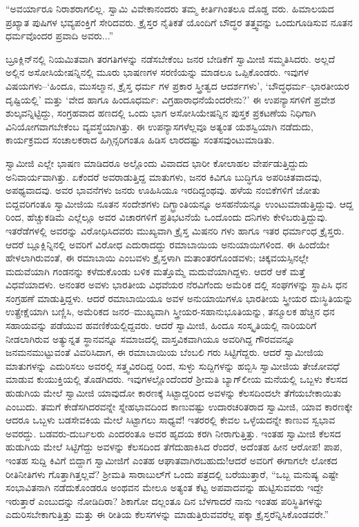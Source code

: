 “ಅವರ್ಯಾರೂ ನಿರಾಶರಾಗಲಿಲ್ಲ. ಸ್ವಾಮಿ ವಿವೇಕಾನಂದರು ತಮ್ಮ ಕೀರ್ತಿಗಿಂತಲೂ ದೊಡ್ಡ ವರು. ಹಿಮಾಲಯದ ಪ್ರಖ್ಯಾತ ಪುಷಿಗಳ ಭವ್ಯಪಂಕ್ತಿಗೆ ಸೇರಿದವರು. ಕ್ರೈಸ್ತರ ನೈತಿಕತೆ ಯೊಂದಿಗೆ ಬೌದ್ಧರ ತತ್ತ್ವವನ್ನು ಒಂದುಗೂಡಿಸುವ ನೂತನ ಧರ್ಮವೊಂದರ ಪ್ರವಾದಿ ಅವರು...”

ಬ್ರೂಕ್ಲಿನ್​ನಲ್ಲಿ ನಿಯಮಿತವಾಗಿ ತರಗತಿಗಳನ್ನು ನಡೆಸಬೇಕೆಂಬ ಜನರ ಬೇಡಿಕೆಗೆ ಸ್ವಾಮೀಜಿ ಸಮ್ಮತಿಸಿದರು. ಅಲ್ಲದೆ ಅಲ್ಲಿನ ಅಸೋಸಿಯೇಷನ್ನಿನಲ್ಲಿ ಮೂರು ಭಾಷಣಗಳ ಸರಣಿಯನ್ನು ಮಾಡಲೂ ಒಪ್ಪಿಕೊಂಡರು. ಇವುಗಳ ವಿಷಯಗಳು–‘ಹಿಂದೂ, ಮುಸಲ್ಮಾನ, ಕ್ರೈಸ್ತ ಧರ್ಮ ಗಳ ಪ್ರಕಾರ ಸ್ತ್ರೀತ್ವದ ಆದರ್ಶಗಳು’, ‘ಬೌದ್ಧಧರ್ಮ–ಭಾರತೀಯರ ದೃಷ್ಟಿಯಲ್ಲಿ’ ಮತ್ತು ‘ವೇದ ಹಾಗೂ ಹಿಂದೂಧರ್ಮ: ವಿಗ್ರಹಾರಾಧನೆಯೆಂದರೇನು?’ ಈ ಉಪನ್ಯಾಸಗಳಿಗೆ ಪ್ರವೇಶ ಶುಲ್ಕವನ್ನಿಟ್ಟಿದ್ದು, ಸಂಗ್ರಹವಾದ ಹಣದಲ್ಲಿ ಒಂದು ಭಾಗ ಅಸೋಸಿಯೇಷನ್ನಿನ ಪುಸ್ತಕ ಪ್ರಕಟಣೆಯ ನಿಧಿಗಾಗಿ ವಿನಿಯೋಗವಾಗಬೇಕೆಂಬ ವ್ಯವಸ್ಥೆಯಾಗಿತ್ತು. ಈ ಉಪನ್ಯಾಸಗಳೆಲ್ಲವೂ ಅತ್ಯಂತ ಯಶಸ್ವಿಯಾಗಿ ನಡೆದುದು, ಕಾರ್ಯಕ್ರಮದ ಸಂಚಾಲಕರಾದ ಹಿಗ್ಗಿನ್ಸರಿಗಂತೂ ಹಿಡಿಸ ಲಾರದಷ್ಟು ಸಂತಸವುಂಟುಮಾಡಿತು.

ಸ್ವಾಮೀಜಿ ಎಲ್ಲೇ ಭಾಷಣ ಮಾಡಿದರೂ ಅಲ್ಲೊಂದು ವಿವಾದದ ಭಾರೀ ಕೋಲಾಹಲ ವೇರ್ಪಡುತ್ತಿದ್ದುದು ಅನಿವಾರ್ಯವಾಗಿತ್ತು. ಏಕೆಂದರೆ ಅವರಾಡುತ್ತಿದ್ದ ಮಾತುಗಳು, ಜನರ ಕಿವಿಗೂ ಬುದ್ಧಿಗೂ ಅಪರಿಚಿತವಾದವು, ಅಪಥ್ಯವಾದವು. ಅವರ ಭಾವನೆಗಳು ಜನರು ಊಹಿಸಿಯೂ ಇರದಿದ್ದಂಥವು. ಹಳೆಯ ನಂಬಿಕೆಗಳಿಗೆ ಜೋತು ಬಿದ್ದವರಿಗಂತೂ ಸ್ವಾಮೀಜಿಯ ನೂತನ ಸಂದೇಶಗಳು ದಿಗ್ಭ್ರಾಂತಿಯನ್ನೂ ಅಸಹನೆಯನ್ನೂ ಉಂಟುಮಾಡುತ್ತಿದ್ದುವು. ಆದ್ದ ರಿಂದ, ಹೆಚ್ಚುಕಡಿಮೆ ಎಲ್ಲೆಲ್ಲೂ ಅವರ ವಿಚಾರಗಳಿಗೆ ಪ್ರತಿಭಟನೆಯೆ ಒಂದೊಂದು ದನಿಗಳು ಕೇಳಿಬರುತ್ತಿದ್ದುವು. ಇತರೆಡೆಗಳಲ್ಲಿ ಅವರನ್ನು ವಿರೋಧಿಸಿದವರು ಮುಖ್ಯವಾಗಿ ಕ್ರೈಸ್ತ ಮಿಷನರಿ ಗಳು ಹಾಗೂ ಇತರ ಧರ್ಮಾಂಧ ಕ್ರೈಸ್ತರು. ಆದರೆ ಬ್ಲೂಕ್ಲಿನ್ನಿನಲ್ಲಿ ಅವರಿಗೆ ವಿರೋಧ ಎದುರಾದದ್ದು ರಮಾಬಾಯಿಯ ಅನುಯಾಯಿಗಳಿಂದ. ಈ ಹಿಂದೆಯೇ ಹೇಳಲಾಗಿರುವಂತೆ, ಈ ರಮಾಬಾಯಿ ಎಂಬವಳು ಕ್ರೈಸ್ತಳಾಗಿ ಮತಾಂತರಗೊಂಡವಳು; ಚಿಕ್ಕವಯಸ್ಸಿನಲ್ಲೇ ಮದುವೆಯಾಗಿ ಗಂಡನನ್ನು ಕಳೆದುಕೊಂಡು ಬಳಿಕ ಮತ್ತೊಮ್ಮೆ ಮದುವೆಯಾಗಿದ್ದಳು. ಆದರೆ ಆಕೆ ಮತ್ತೆ ವಿಧವೆಯಾದಳು. ಅನಂತರ ಅವಳು ಭಾರತೀಯ ವಿಧವೆಯರ ನೆರವಿಗೆಂದು ಅಮೆರಿಕ ದಲ್ಲಿ ಸಂಘಗಳನ್ನು ಸ್ಥಾಪಿಸಿ ಧನ ಸಂಗ್ರಹಣೆ ಮಾಡುತ್ತಿದ್ದಳು. ಆದರೆ ರಮಾಬಾಯಿಯೂ ಅವಳ ಅನುಯಾಯಿಗಳೂ ಭಾರತೀಯ ಸ್ತ್ರೀಯರ ದುಃಸ್ಥಿತಿಯನ್ನು ಉತ್ಪ್ರೇಕ್ಷೆಯಾಗಿ ಬಣ್ಣಿಸಿ, ಅಮೆರಿಕದ ಜನರ–ಮುಖ್ಯವಾಗಿ ಸ್ತ್ರೀಯರ-ಸಹಾನುಭೂತಿಯನ್ನು, ತನ್ಮೂಲಕ ಹೆಚ್ಚಿನ ಧನ ಸಹಾಯವನ್ನು ಪಡೆಯುವ ಹವಣಿಕೆಯಲ್ಲಿದ್ದವರು. ಆದರೆ ಸ್ವಾಮೀಜಿ, ಹಿಂದೂ ಸಂಸ್ಕೃತಿಯಲ್ಲಿ ನಾರಿಯರಿಗೆ ನೀಡಲಾಗಿರುವ ಅತ್ಯುನ್ನತ ಸ್ಥಾನವನ್ನೂ ಸಮಾಜದಲ್ಲಿ ವಾಸ್ತವಿಕವಾಗಿಯೂ ಅವರಿಗಿದ್ದ ಗೌರವವನ್ನೂ ಜನಮನಮುಟ್ಟುವಂತೆ ವಿವರಿಸಿದಾಗ, ಈ ರಮಾಬಾಯಿಯ ಬೆಂಬಲಿ ಗರು ಸಿಟ್ಟಿಗೆದ್ದರು. ಆದರೆ ಸ್ವಾಮೀಜಿಯ ಮಾತುಗಳನ್ನು ಎದುರಿಸಲು ಅವರಲ್ಲಿ ಸತ್ತ್ವವಿರದಿದ್ದ ರಿಂದ, ಸುಳ್ಳು ಸುದ್ದಿಗಳನ್ನು ಹಬ್ಬಿಸಿ ಸ್ವಾಮೀಜಿಯ ತೇಜೋವಧೆ ಮಾಡುವ ಕುಯುಕ್ತಿಯಲ್ಲಿ ತೊಡಗಿದರು. ಇವುಗಳಲ್ಲೊಂದೆಂದರೆ ಶ್ರೀಮತಿ ಬ್ಯಾಗ್​ಲೀಯ ಮನೆಯಲ್ಲಿ ಒಬ್ಬಳು ಕೆಲಸದ ಹುಡುಗಿಯ ಮೇಲೆ ಸ್ವಾಮೀಜಿ ಯಾವುದೋ ಕಾರಣಕ್ಕೆ ಸಿಟ್ಟಾದ್ದರಿಂದ ಅವಳನ್ನು ಕೆಲಸದಿಂದಲೇ ತೆಗೆಯಬೇಕಾಯಿತು ಎಂಬುದು. ತಮಗೆ ಕೇಡೆಸಗಿದರವನ್ನೇ ಸ್ನೇಹಭಾವದಿಂದ ಕಾಣುವಷ್ಟು ಉದಾರಚರಿತರಾದ ಸ್ವಾಮೀಜಿ, ಯಾವ ಕಾರಣಕ್ಕೇ ಆದರೂ ಒಬ್ಬಳು ಬಡಸೇವಕಿಯ ಮೇಲೆ ಸಿಟ್ಟಾಗಲು ಸಾಧ್ಯವೆ! ಇತರರಲ್ಲಿ ಕೇವಲ ಒಳ್ಳೆಯದನ್ನೇ ಕಾಣುವ ಸ್ವಭಾವ ಅವರದ್ದು. ಬಡವರು-ದುರ್ಬಲರು ಎಂದರಂತೂ ಅವರ ಹೃದಯ ಕರಗಿ ನೀರಾಗುತ್ತಿತ್ತು. ಇಂತಹ ಸ್ವಾಮೀಜಿ ಕೆಲಸದ ಹುಡುಗಿಯ ಮೇಲೆ ಸಿಟ್ಟಿಗೆದ್ದು ಅವಳನ್ನು ಕೆಲಸದಿಂದ ತೆಗೆದುಹಾಕಿಸಿದ ರೆಂದರೆ, ಅದೆಂತಹ ಹೀನ ಆರೋಪ! ಪಾಪ, ಇಂತಹ ಸುದ್ದಿ ಕಿವಿಗೆ ಬಿದ್ದಾಗ ಸ್ವಾಮೀಜಿಗೆ ಎಂತಹ ಆಘಾತವಾಗಿರಬಹುದು!ಆದರೆ ಅವರಿಗೆ ಈಗಾಗಲೇ ಲೋಕದ ರೀತಿನೀತಿಗಳು ಗೊತ್ತಾಗಿತ್ತಲ್ಲವೆ? ಶ್ರೀಮತಿ ಸಾರಾಬುಲ್​ಗೆ ಒಂದು ಪತ್ರದಲ್ಲಿ ಬರೆಯುತ್ತಾರೆ, “ಒಬ್ಬ ಮನುಷ್ಯ ಎಷ್ಟೇ ಸಂಭಾವಿತನಾಗಿ ನಡೆದುಕೊಂಡರೂ ಅಂಥವನ ಮೇಲೂ ಅತ್ಯಂತ ಕೆಟ್ಟ ಅಪವಾದವನ್ನು ಹುಟ್ಟಿಸುವವರು ಇದ್ದೇ ಇರುತ್ತಾರೆ ಎಂಬುದನ್ನು ನೋಡಿದಿರಾ? ಶಿಕಾಗೋ ದಲ್ಲಂತೂ ದಿನ ಬೆಳಗಾದರೆ ನಾನು ಇಂತಹ ಪರಿಸ್ಥಿತಿಗಳನ್ನು ಎದುರಿಸಬೇಕಾಗುತ್ತಿತ್ತು ಮತ್ತು ಈ ರೀತಿಯ ಕೆಲಸಗಳನ್ನು ಮಾಡುತ್ತಿರುವವರೆಲ್ಲ ಪಕ್ಕಾ ಕ್ರೈಸ್ತರೆನ್ನಿಸಿಕೊಂಡವರೇ.”

